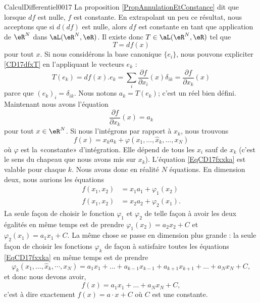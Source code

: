 \begin{corrige}{CalculDifferentiel0017}
	La proposition \ref{PropAnnulationEtConstance} dit que lorsque $df$ est nulle, $f$ est constante. En extrapolant un peu ce résultat, nous acceptons que si $d(df)$ est nulle, alors $df$ est constante en tant que application de $\eR^N$ dans $\aL(\eR^N,\eR)$. Il existe donc $T\in\aL(\eR^N,\eR)$ tel que
	\begin{equation}		\label{CD17dfxT}
		T=df(x)
	\end{equation}
	pour tout $x$. Si nous considérons la base canonique $\{ e_i \}$, nous pouvons expliciter \eqref{CD17dfxT} en l'appliquant le vecteurs $e_k$ :
	\begin{equation}
		T(e_k)=df(x).e_k=\sum_i\frac{ \partial f }{ \partial x_i }(x)\delta_{ik}=\frac{ \partial f }{ \partial x_k }(x)
	\end{equation}
	parce que $(e_k)_i=\delta_{ik}$. Nous notons $a_k=T(e_k)$; c'est un réel bien défini. Maintenant nous avons l'équation
	\begin{equation}
		\frac{ \partial f }{ \partial x_k }(x)=a_k
	\end{equation}
	pour tout $x\in\eR^N$. Si nous l'intégrons par rapport à $x_k$, nous trouvons
	\begin{equation}		\label{EqCD17fxxka}
		f(x)=x_ka_k+\varphi(x_1,\ldots,\hat x_k,\ldots,x_N)
	\end{equation}
	où $\varphi$ est la «constante» d'intégration. Elle dépend de tous les $x_i$ sauf de $x_k$ (c'est le sens du chapeau que nous avons mis sur $x_k$). L'équation \eqref{EqCD17fxxka} est valable pour chaque $k$. Nous avons donc en réalité $N$ équations. En dimension deux, nous aurions les équations
	\begin{subequations}
		\begin{align}
			f(x_1,x_2)&=x_1a_1+\varphi_1(x_2)\\
			f(x_1,x_2)&=x_2a_2+\varphi_2(x_1).
		\end{align}
	\end{subequations}
	La seule façon de choisir le fonction $\varphi_1$ et $\varphi_2$ de telle façon à avoir les deux égalités en même temps est de prendre $\varphi_1(x_2)=a_2x_2+C$ et $\varphi_2(x_1)=a_1x_1+C$. La même chose se passe en dimension plus grande : la seule façon de choisir les fonctions $\varphi_k$ de façon à satisfaire toutes les équations \eqref{EqCD17fxxka} en même temps est de prendre
	\begin{equation}
		\varphi_k(x_1,\ldots,\hat x_k,\cdots,x_N)=a_1x_1+\ldots+a_{k-1}x_{k-1}+a_{k+1}x_{k+1}+\ldots+a_Nx_N+C,
	\end{equation}
	et donc nous devons avoir,
	\begin{equation}
		f(x)=a_1x_1+\ldots+a_Nx_N+C,
	\end{equation}
	c'est à dire exactement $f(x)=a\cdot x+C$ où $C$ est une constante.

\end{corrige}
